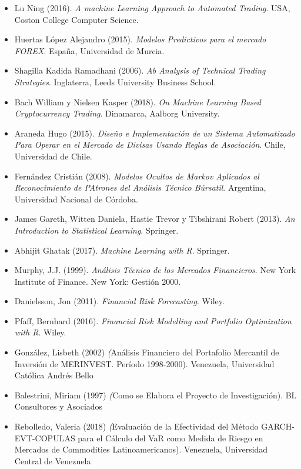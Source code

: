 \documentclass[a4paper,12pt]{Latex/Classes/PhDthesisPSnPDF}
\begin{document}
\begin{itemize}

\item Lu Ning (2016). \textit{A machine Learning Approach to Automated Trading}. USA, Coston College Computer Science.

\item Huertas López Alejandro (2015). \textit{Modelos Predictivos para el mercado FOREX}. España, Universidad de Murcia.

\item Shagilla Kadida Ramadhani (2006). \textit{Ab Analysis of Technical Trading Strategies}. Inglaterra, Leeds University Business School.

\item Bach William y Nielsen Kasper (2018). \textit{On Machine Learning Based Cryptocurrency Trading}. Dinamarca, Aalborg University.

\item Araneda Hugo (2015). \textit{Diseño e Implementación de un Sistema Automatizado Para Operar en el Mercado de Divisas Usando Reglas de Asociación}. Chile, Universidad de Chile.

\item Fernández Cristián (2008). \textit{Modelos Ocultos de Markov Aplicados al Reconocimiento de PAtrones del Análisis Técnico Búrsatil}. Argentina, Universidad Nacional de Córdoba.

\item James Gareth, Witten Daniela, Hastie Trevor y Tibshirani Robert (2013). \textit{An Introduction to Statistical Learning}. Springer.

\item Abhijit Ghatak (2017). \textit{Machine Learning with R}. Springer.

\item Murphy, J.J. (1999). \textit{Análisis Técnico de los Mercados Financieros}. New York Institute of Finance. New York: Gestión 2000.

\item Danielsson, Jon (2011). \textit{Financial Risk Forecasting}. Wiley.

\item Pfaff, Bernhard (2016). \textit{Financial Risk Modelling and
Portfolio Optimization with R}. Wiley.

\item González, Lisbeth (2002) \textit(Análisis Financiero del Portafolio Mercantil de Inversión de MERINVEST. Período 1998-2000). Venezuela, Universidad Católica Andrés Bello

\item Balestrini, Miriam (1997) \textit(Como se Elabora el Proyecto de Investigación). BL Consultores y Asociados

\item Rebolledo, Valeria (2018) \textit(Evaluación de la Efectividad del Método GARCH-EVT-COPULAS para el Cálculo del VaR como Medida de Riesgo en Mercados de Commodities Latinoamericanos). Venezuela, Universidad Central de Venezuela

\end{itemize}
\end{document}
